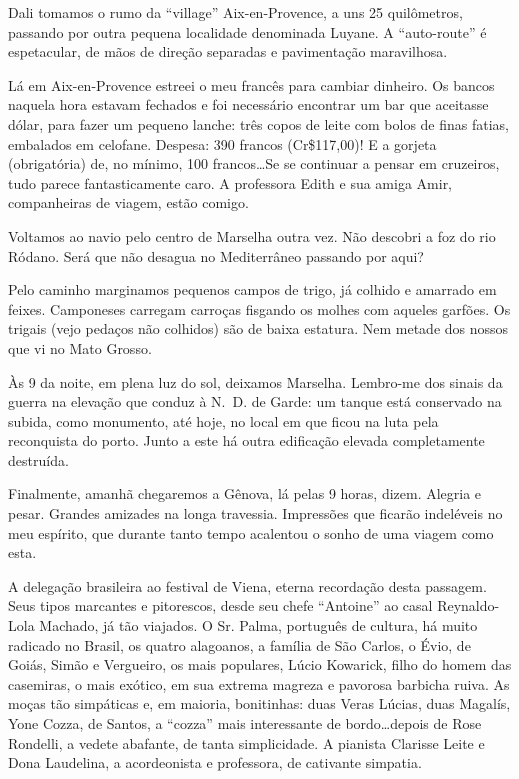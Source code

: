 Dali tomamos o rumo da ``village'' Aix-en-Provence, a uns 25 quilômetros, passando por outra pequena localidade denominada Luyane. A ``auto-route'' é espetacular, de mãos de direção separadas e pavimentação maravilhosa.

Lá em Aix-en-Provence estreei o meu francês para cambiar dinheiro. Os bancos naquela hora estavam fechados e foi necessário encontrar um bar que aceitasse dólar, para fazer um pequeno lanche: três copos de leite com bolos de finas fatias, embalados em celofane. Despesa: 390 francos (Cr\$117,00)! E a gorjeta (obrigatória) de, no mínimo, 100 francos\ldots Se se continuar a pensar em cruzeiros, tudo parece fantasticamente caro. A professora Edith e sua amiga Amir, companheiras de viagem, estão comigo.

Voltamos ao navio pelo centro de Marselha outra vez. Não descobri a foz do rio Ródano. Será que não desagua no Mediterrâneo passando por aqui?

Pelo caminho marginamos pequenos campos de trigo, já colhido e amarrado em feixes. Camponeses carregam carroças fisgando os molhes com aqueles garfões. Os trigais (vejo pedaços não colhidos) são de baixa estatura. Nem metade dos nossos que vi no Mato Grosso.

Às 9 da noite, em plena luz do sol, deixamos Marselha. Lembro-me dos sinais da guerra na elevação que conduz à N.~D. de Garde: um tanque está conservado na subida, como monumento, até hoje, no local em que ficou na luta pela reconquista do porto. Junto a este há outra edificação elevada completamente destruída.

Finalmente, amanhã chegaremos a Gênova, lá pelas 9 horas, dizem. Alegria e pesar. Grandes amizades na longa travessia. Impressões que ficarão indeléveis no meu espírito, que durante tanto tempo acalentou o sonho de uma viagem como esta.

A delegação brasileira ao festival de Viena, eterna recordação desta passagem. Seus tipos marcantes e pitorescos, desde seu chefe ``Antoine'' ao casal Reynaldo-Lola Machado, já tão viajados. O Sr. Palma, português de cultura, há muito radicado no Brasil, os quatro alagoanos, a família de São Carlos, o Évio, de Goiás, Simão e Vergueiro, os mais populares, Lúcio Kowarick, filho do homem das casemiras, o mais exótico, em sua extrema magreza e pavorosa barbicha ruiva. As moças tão simpáticas e, em maioria, bonitinhas: duas Veras Lúcias, duas Magalís, Yone Cozza, de Santos, a ``cozza'' mais interessante de bordo\ldots depois de Rose Rondelli, a vedete abafante, de tanta simplicidade. A pianista Clarisse Leite e Dona Laudelina, a acordeonista e professora, de cativante simpatia.

